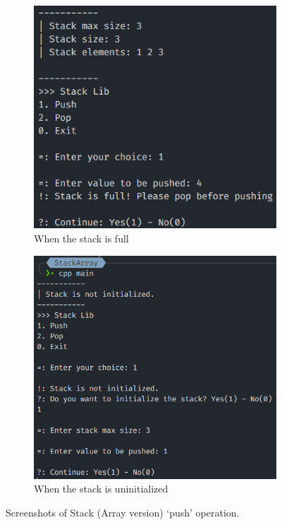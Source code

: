\begin{figure}[!ht]
\begin{subfigure}{0.54\textwidth}
		\includegraphics[width=\textwidth]{imgs/StackArray/push/full.png}
		\caption{When the stack is full}\label{fig:stack_arr_push_full}
	\end{subfigure}
	\hfill
	\begin{subfigure}{0.75\textwidth}
		\centering
		\includegraphics[width=\textwidth]{imgs/StackArray/push/empty.png}
		\caption{When the stack is uninitialized}\label{fig:stack_arr_push_empty}
	\end{subfigure}
	\caption{Screenshots of Stack (Array version) `push' operation.}\label{fig:stack_arr_push_cases}
\end{figure}
